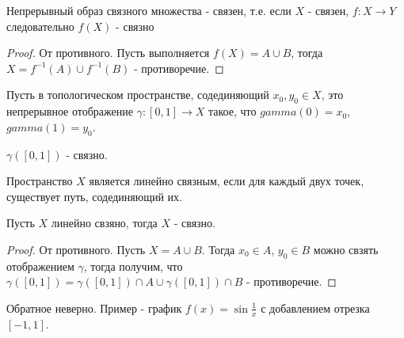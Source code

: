 \begin{statement}
    Непрерывный образ связного множества - связен, т.е.
    если $X$ - связен, $f: X \rightarrow Y$ следовательно $f(X)$ - связно
\end{statement}
\begin{proof}
    От противного.
    Пусть выполняется $f(X) = A \cup B$, тогда $X = f^{-1}(A) \cup f^{-1}(B)$ - противоречие.
\end{proof}

\begin{definition}
    Пусть в топологическом пространстве, содединяющий $x_0, y_0 \in X$, это непрерывное отображение $\gamma: [0,1] \rightarrow X$ такое, что $gamma(0) = x_0$, $gamma(1) = y_0$. 
\end{definition}

\begin{nota_bene}
    $\gamma([0, 1])$ - связно.
\end{nota_bene}

\begin{definition}
    Пространство $X$ является линейно связным, если для каждый двух точек, существует путь, содединяющий их.
\end{definition}

\begin{theorem}
    Пусть $X$ линейно свзяно, тогда $X$ - связно.
\end{theorem}
\begin{proof}
    От противного. Пусть $X = A \cup B$. Тогда $x_0 \in A$, $y_0 \in B$ можно свзять отображением $\gamma$, тогда получим, что $\gamma([0, 1]) = \gamma([0, 1]) \cap A \cup \gamma([0, 1]) \cap B$ - противоречие.
\end{proof}

\begin{nota_bene}
    Обратное неверно. Пример - график $f(x) = \sin \frac{1}{x}$ с добавлением отрезка $[-1, 1]$.
\end{nota_bene}